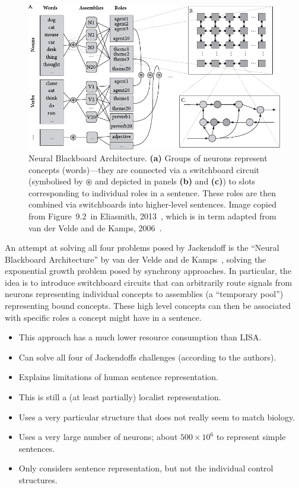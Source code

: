 \documentclass[10pt,letterpaper,oneside]{article}
\begin{document}
\begin{figure}[t]
	\centering
	\includegraphics[width=\textwidth]{media/eliasmith_2013_blackboard.pdf}
	\caption{Neural Blackboard Architecture. \textbf{(a)} Groups of neurons represent concepts (words)---they are connected via a switchboard circuit (symbolised by $\circledast$ and depicted in panels \textbf{(b)} and \textbf{(c)}) to slots corresponding to individual roles in a sentence. These roles are then combined via switchboards into higher-level sentences. Image copied from Figure~9.2~in Eliasmith, 2013~\cite{eliasmith2013how}, which is in term adapted from van der Velde and de Kamps, 2006~\cite{vandervelde2006neural}.}
\end{figure}

An attempt at solving all four problems posed by Jackendoff is the \enquote{Neural Blackboard Architecture} by van der Velde and de Kamps~\cite{vandervelde2006neural}, solving the exponential growth problem posed by synchrony approaches. In particular, the idea is to introduce switchboard circuits that can arbitrarily route signals from neurons representing individual concepts to assemblies (a \enquote{temporary pool}) representing bound concepts. These high level concepts can then be associated with specific roles a concept might have in a sentence.
\begin{itemize}
	\item[\OPlus] This approach has a much lower resource consumption than LISA.
	\item[\OPlus] Can solve all four of Jackendoffs challenges (according to the authors).
	\item[\OPlus] Explains limitations of human sentence representation.
	\item[\OMeh] This is still a (at least partially) localist representation.
	\item[\OMinus] Uses a very particular structure that does not really seem to match biology.
	\item[\OMinus] Uses a very large number of neurons; about $500\times 10^6$ to represent simple sentences.
	\item[\OMinus] Only considers sentence representation, but not the individual control structures.
\end{itemize}
\end{document}
